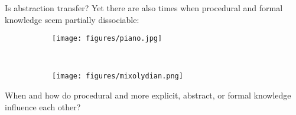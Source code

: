\documentclass{beamer}
\begin{document}
\begin{frame}{Is abstraction transfer?}
Yet there are also times when procedural and formal knowledge seem partially dissociable:
\begin{figure}
\centering
\begin{subfigure}{0.4\textwidth}
\texttt{[image: figures/piano.jpg]}
\end{subfigure}~%
\begin{subfigure}{0.5\textwidth}
\texttt{[image: figures/mixolydian.png]}
\end{subfigure}%
\end{figure}
\note{}
\end{frame}

\begin{frame}[standout]
When and how do procedural and more explicit, abstract, or formal knowledge influence each other?
\end{frame}
\end{document}
